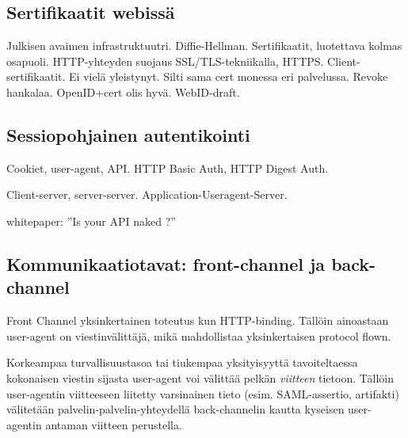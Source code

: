 \documentclass[finnish,gradu]{tktltiki}
\begin{document}



  \subsection{Sertifikaatit webissä} %
  \label{sub:sertifikaatit_webissä}
  Julkisen avaimen infrastruktuutri.
  Diffie-Hellman.
  Sertifikaatit, luotettava kolmas osapuoli.
  HTTP-yhteyden suojaus SSL/TLS-tekniikalla, HTTPS.
  Client-sertifikaatit. Ei vielä yleistynyt. Silti sama cert monessa eri palvelussa. Revoke hankalaa. OpenID+cert olis hyvä.
  WebID-draft.


  \subsection{Sessiopohjainen autentikointi} %
  \label{sub:sessiopohjainen_autentikointi}
  Cookiet, user-agent, API. HTTP Basic Auth, HTTP Digest Auth.

  Client-server, server-server. Application-Useragent-Server.

  whitepaper: ''Is your API naked ?''



  \subsection{Kommunikaatiotavat: front-channel ja back-channel} %
  \label{sub:kommunikaatiotavat_front_channel_ja_back_channel}

  Front Channel yksinkertainen toteutus kun HTTP-binding. Tällöin ainoastaan user-agent on viestinvälittäjä, mikä mahdollistaa yksinkertaisen protocol flown.

  Korkeampaa turvallisuustasoa tai tiukempaa yksityisyyttä tavoiteltaessa kokonaisen viestin sijasta user-agent voi välittää pelkän \emph{viitteen} tietoon. Tällöin user-agentin viitteeseen liitetty varsinainen tieto (esim. SAML-assertio, artifakti) välitetään palvelin-palvelin-yhteydellä back-channelin kautta kyseisen user-agentin antaman viitteen perustella.
\end{document}
